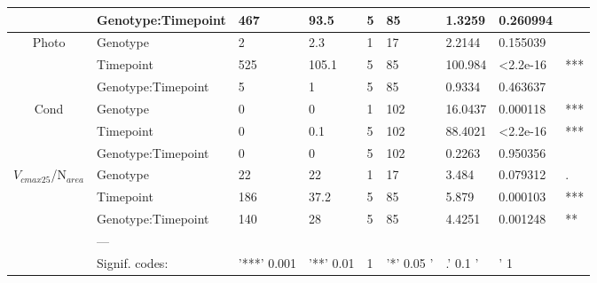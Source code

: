 \documentclass{article}
\begin{document}
\begin{table}[ht]
\begin{adjustbox}
\begin{tabular}{@{}cllllllll@{}}
			                                                  & Genotype:Timepoint & 467             & 93.5             & 5              & 85             & 1.3259           & 0.260994                     &     \\
			\midrule \multirow{3}{*}{Photo}                   & Genotype           & 2               & 2.3              & 1              & 17             & 2.2144           & 0.155039                     &     \\
			                                                  & Timepoint          & 525             & 105.1            & 5              & 85             & 100.984          & \textless 2.2e-16            & *** \\
			                                                  & Genotype:Timepoint & 5               & 1                & 5              & 85             & 0.9334           & 0.463637                     &     \\
			\midrule \multirow{3}{*}{Cond}                    & Genotype           & 0               & 0                & 1              & 102            & 16.0437          & 0.000118                     & *** \\
			                                                  & Timepoint          & 0               & 0.1              & 5              & 102            & 88.4021          & \textless 2.2e-16            & *** \\
			                                                  & Genotype:Timepoint & 0               & 0                & 5              & 102            & 0.2263           & 0.950356                     &     \\
			\midrule \multirow{3}{*}{$V_{cmax25}$/N$_{area}$} & Genotype           & 22              & 22               & 1              & 17             & 3.484            & 0.079312                     & .   \\
			                                                  & Timepoint          & 186             & 37.2             & 5              & 85             & 5.879            & 0.000103                     & *** \\
			                                                  & Genotype:Timepoint & 140             & 28               & 5              & 85             & 4.4251           & 0.001248                     & **  \\
			                                                  & ---                &                 &                  &                &                &                  &                              &     \\
			                                                  & Signif. codes:     & '***' 0.001     & '**' 0.01        & 1              & '*' 0.05 '     & .' 0.1 '         & ' 1                          &     \\
			\bottomrule
		\end{tabular}
	\end{adjustbox}
\end{table}
\end{document}

